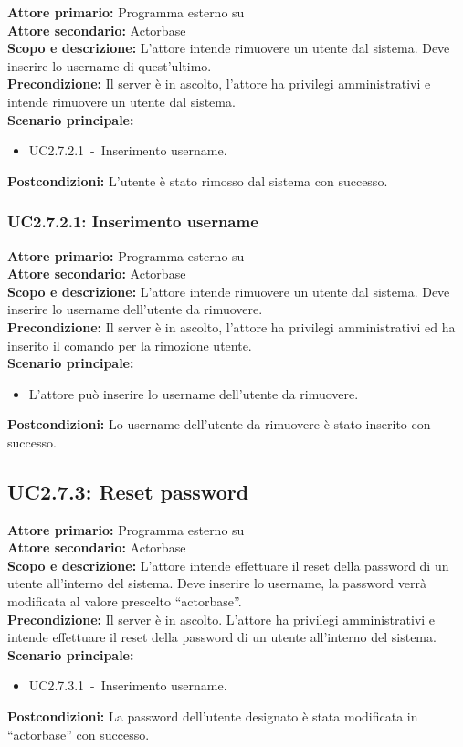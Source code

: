 \documentclass{scalatekids-article}
\begin{document}
\textbf{Attore primario:} Programma esterno su \\
\textbf{Attore secondario:} Actorbase\\
\textbf{Scopo e descrizione:} L'attore intende rimuovere un utente dal sistema. Deve inserire lo username di quest'ultimo.\\
\textbf{Precondizione:} Il server è in ascolto, l'attore ha privilegi amministrativi e intende rimuovere un utente dal sistema.\\
\textbf{Scenario principale:}
\begin{itemize}
\item UC2.7.2.1\ -\ Inserimento username.
\end{itemize}
\textbf{Postcondizioni:} L'utente è stato rimosso dal sistema con successo.

\subsubsection{UC2.7.2.1: Inserimento username}

\textbf{Attore primario:} Programma esterno su \\
\textbf{Attore secondario:} Actorbase\\
\textbf{Scopo e descrizione:} L'attore intende rimuovere un utente dal sistema. Deve inserire lo username dell'utente da rimuovere.\\
\textbf{Precondizione:} Il server è in ascolto, l'attore ha privilegi amministrativi ed ha inserito il comando per la rimozione utente.\\
\textbf{Scenario principale:}
\begin{itemize}
\item L'attore può inserire lo username dell'utente da rimuovere.
\end{itemize}
\textbf{Postcondizioni:} Lo username dell'utente da rimuovere è stato inserito con successo.

\subsection{UC2.7.3: Reset password}

\textbf{Attore primario:} Programma esterno su \\
\textbf{Attore secondario:} Actorbase\\
\textbf{Scopo e descrizione:} L'attore intende effettuare il reset della password di un utente all'interno del sistema. Deve inserire lo username, la password verrà modificata al valore prescelto ``actorbase''.\\
\textbf{Precondizione:} Il server è in ascolto. L'attore ha privilegi amministrativi e intende effettuare il reset della password di un utente all'interno del sistema.\\
\textbf{Scenario principale:}
\begin{itemize}
\item UC2.7.3.1\ -\ Inserimento username.
\end{itemize}
\textbf{Postcondizioni:} La password dell'utente designato è stata modificata in ``actorbase'' con successo.
\end{document}
